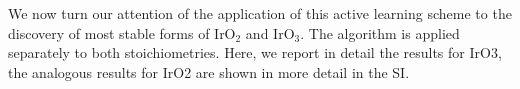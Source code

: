 %



%
We now turn our attention of the application of this active learning scheme to the discovery of most stable forms of IrO$_2$ and IrO$_3$.
%
The algorithm is applied separately to both stoichiometries.
%
Here, we report in detail the results for IrO3, the analogous results for IrO2 are shown in more detail in the SI.



